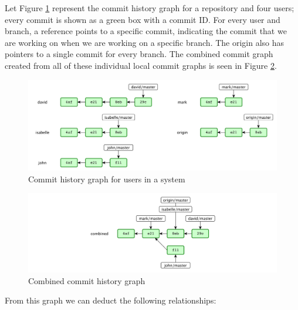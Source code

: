 Let Figure \ref{fig:commitgraph1} represent the commit history graph for a repository and four users; every commit is shown as a green box with a commit ID. For every user and branch, a reference points to a specific commit, indicating the commit that we are working on when we are working on a specific branch. The origin also has pointers to a single commit for every branch. The combined commit graph created from all of these individual local commit graphs is seen in Figure \ref{fig:commitgraph2}.


\begin{figure}[h!]
  \centering
      \includegraphics[width=1\textwidth]{commitgraph1}
  \caption{Commit history graph for users in a system}
  \label{fig:commitgraph1}
\end{figure}


\begin{figure}[h!]
  \centering
      \includegraphics[width=1\textwidth]{commitgraph2}
  \caption{Combined commit history graph}
  \label{fig:commitgraph2}
\end{figure}

From this graph we can deduct the following relationships:

